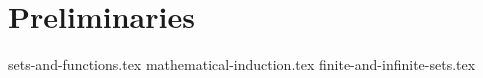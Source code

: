 \chapter{Preliminaries}
{sets-and-functions.tex}
{mathematical-induction.tex}
{finite-and-infinite-sets.tex}
